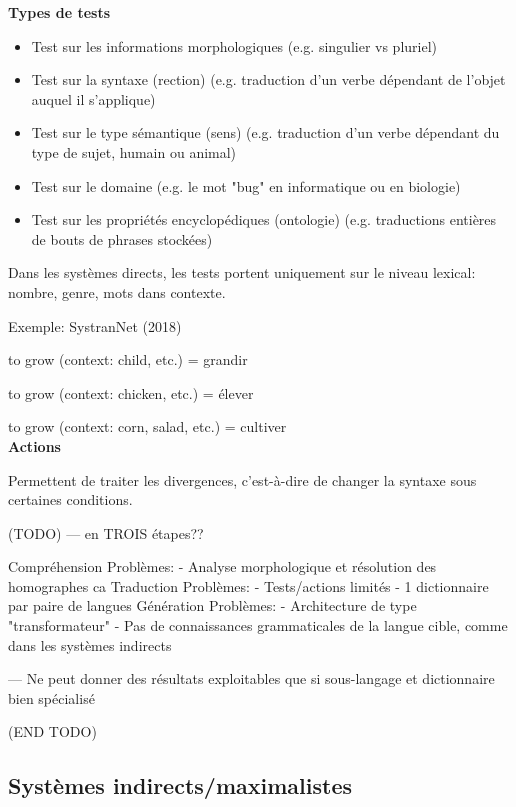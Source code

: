 \textbf{Types de tests}

\begin{itemize}
    \item Test sur les informations morphologiques (e.g. singulier vs pluriel)
    \item Test sur la syntaxe (rection) (e.g. traduction d'un verbe dépendant de
    l'objet auquel il s'applique)
    \item Test sur le type sémantique (sens) (e.g. traduction d'un verbe dépendant
    du type de sujet, humain ou animal)
    \item Test sur le domaine (e.g. le mot "bug" en informatique ou en biologie)
    \item Test sur les propriétés encyclopédiques (ontologie) (e.g. traductions
    entières de bouts de phrases stockées)\\
\end{itemize}

Dans les systèmes directs, les tests portent uniquement sur le niveau lexical:
nombre, genre, mots dans contexte.

Exemple: SystranNet (2018)

to grow (context: child, etc.) = grandir

to grow (context: chicken, etc.) = élever

to grow (context: corn, salad, etc.) = cultiver \\

\textbf{Actions}

Permettent de traiter les divergences, c'est-à-dire de changer la syntaxe sous
certaines conditions.

(TODO)
---
en TROIS étapes??

Compréhension
    Problèmes:
        - Analyse morphologique et résolution des homographes ca
Traduction
    Problèmes:
        - Tests/actions limités
        - 1 dictionnaire par paire de langues
Génération
    Problèmes:
        - Architecture de type "transformateur"
        - Pas de connaissances grammaticales de la langue cible, comme dans les systèmes indirects

---
Ne peut donner des résultats exploitables que si sous-langage et dictionnaire bien spécialisé

(END TODO)

\subsection{Systèmes indirects/maximalistes}


